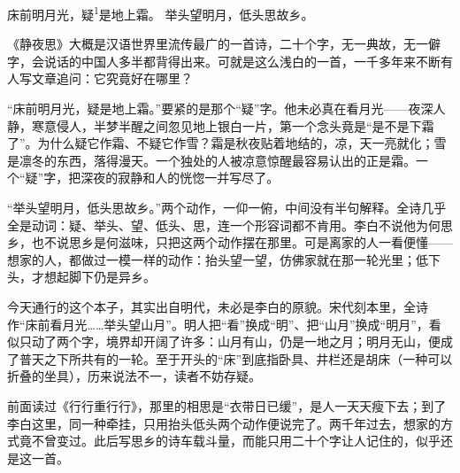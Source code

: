 
\begin{poem}
床前明月光，疑\textsuperscript{1}是地上霜。
举头望明月，低头思故乡。
\end{poem}

\begin{annotations}
\end{annotations}

\begin{appreciation}
《静夜思》大概是汉语世界里流传最广的一首诗，二十个字，无一典故，无一僻字，会说话的中国人多半都背得出来。可就是这么浅白的一首，一千多年来不断有人写文章追问：它究竟好在哪里？

“床前明月光，疑是地上霜。”要紧的是那个“疑”字。他未必真在看月光——夜深人静，寒意侵人，半梦半醒之间忽见地上银白一片，第一个念头竟是“是不是下霜了”。为什么疑它作霜、不疑它作雪？霜是秋夜贴着地结的，凉，天一亮就化；雪是凛冬的东西，落得漫天。一个独处的人被凉意惊醒最容易认出的正是霜。一个“疑”字，把深夜的寂静和人的恍惚一并写尽了。

“举头望明月，低头思故乡。”两个动作，一仰一俯，中间没有半句解释。全诗几乎全是动词：疑、举头、望、低头、思，连一个形容词都不肯用。李白不说他为何思乡，也不说思乡是何滋味，只把这两个动作摆在那里。可是离家的人一看便懂——想家的人，都做过一模一样的动作：抬头望一望，仿佛家就在那一轮光里；低下头，才想起脚下仍是异乡。

今天通行的这个本子，其实出自明代，未必是李白的原貌。宋代刻本里，全诗作“床前看月光……举头望山月”。明人把“看”换成“明”、把“山月”换成“明月”，看似只动了两个字，境界却开阔了许多：山月有山，仍是一地之月；明月无山，便成了普天之下所共有的一轮。至于开头的“床”到底指卧具、井栏还是胡床（一种可以折叠的坐具），历来说法不一，读者不妨存疑。

前面读过《行行重行行》，那里的相思是“衣带日已缓”，是人一天天瘦下去；到了李白这里，同一种牵挂，只用抬头低头两个动作便说完了。两千年过去，想家的方式竟不曾变过。此后写思乡的诗车载斗量，而能只用二十个字让人记住的，似乎还是这一首。
\end{appreciation}

